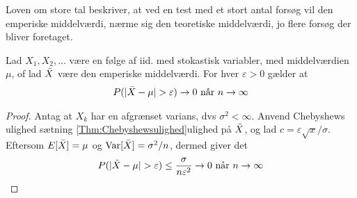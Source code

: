 Loven om store tal beskriver, at ved en test med et stort antal forsøg vil den emperiske middelværdi, nærme sig den teoretiske middelværdi, jo flere forsøg der bliver foretaget.
\begin{thm} \label{thm:law_of_large_numbers}%
    Lad $X_1, X_2, \dots$ være en følge af iid. med stokastisk variabler, med middelværdien $\mu$, of lad $\Bar{X}$ være den emperiske middelværdi. For hver $\varepsilon>0$ gælder at
    \begin{align*}
        P(|\Bar{X}-\mu|>\varepsilon) \rightarrow 0 \text{ når } n \rightarrow \infty
    \end{align*}
\end{thm}
\begin{proof}
    Antag at $X_k$ har en afgrænset varians, dvs $\sigma^2<\infty$. Anvend Chebyshews ulighed sætning \ref{Thm:Chebyshewsulighed}ulighed på $\Bar{X}$, og lad $c=\varepsilon \sqrt{x}/\sigma$. Eftersom $E[\Bar{X}]=\mu$ og $\textnormal{Var}[\Bar{X}]=\sigma^2/n$, dermed giver det
    \begin{align*}
        P(|\Bar{X}-\mu| > \varepsilon) \leq \frac{\sigma}{n\varepsilon^2} \rightarrow 0 \text{ når } n \rightarrow \infty
    \end{align*}
\end{proof}
